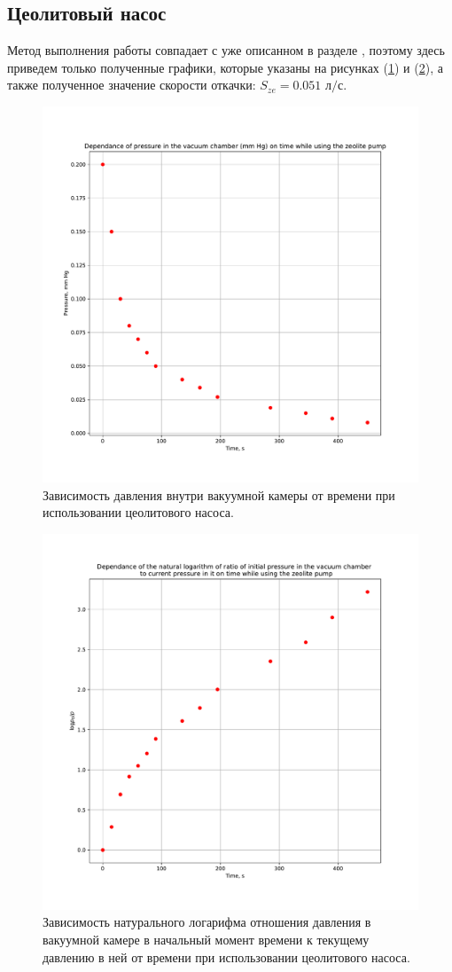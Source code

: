 \documentclass[a4paper, 12pt]{article}
\begin{document}
\subsection{Цеолитовый насос}

Метод выполнения работы совпадает с уже описанном в разделе , поэтому здесь приведем только полученные графики, которые указаны на рисунках (\ref{fig:cryo_p}) и (\ref{fig:cryo_ln}), а также полученное значение скорости откачки: $\boxed{S_{ze} = 0.051 \text{ л/с}}$.

\begin{figure}[h]
	\centering
	\includegraphics[width=0.8\linewidth]{lab_1_cryo_p}
	\caption{Зависимость давления внутри вакуумной камеры от времени при использовании цеолитового насоса.}
	\label{fig:cryo_p}
\end{figure}

\begin{figure}[h]
	\centering
	\includegraphics[width=0.8\linewidth]{lab_1_cryo_ln}
	\caption{Зависимость натурального логарифма отношения давления в вакуумной камере в начальный момент времени к текущему давлению в ней от времени при использовании цеолитового насоса.}
	\label{fig:cryo_ln}
\end{figure}
\end{document}
